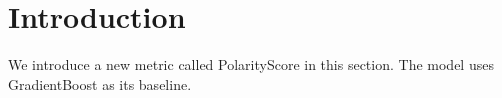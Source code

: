 \section{Introduction}
We introduce a new metric called PolarityScore in this section.
The model uses GradientBoost as its baseline.
